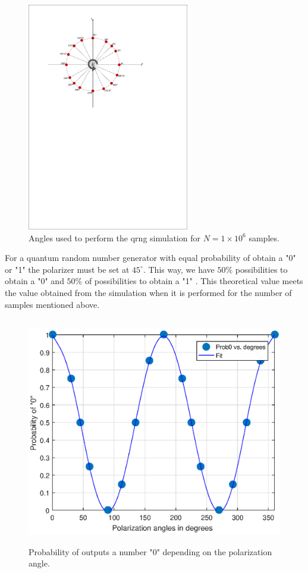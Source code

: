 \begin{figure}[H]
    \centering
        \includegraphics[clip, trim=0.5cm 15.5cm 2.5cm 1cm, height = 10cm]{./sdf/qrng/figures_raw/sphere.pdf}
    \caption{Angles used to perform the qrng simulation for $N=1 \times 10^{6}$ samples. }\label{sphere}
\end{figure}

For a quantum random number generator with equal probability of obtain a "0" \space or "1" \space the polarizer must be set at $45^{\circ}$. This way, we have $50\%$ possibilities to obtain a "0" \space and $50\%$ of possibilities to obtain a "1" \space. This theoretical value meets the value obtained from the simulation when it is performed for the number of samples mentioned above.

\begin{figure}[H]
    \centering
        \includegraphics[width=15cm,height=10cm]{./sdf/qrng/figures_raw/prob0.eps}
    \caption{Probability of outputs a number "0" \space depending on the polarization angle.}\label{probx}
\end{figure}

